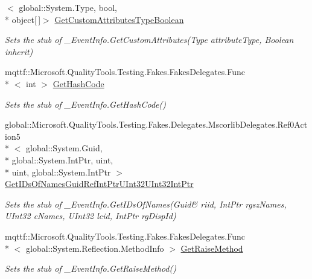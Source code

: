 \begin{DoxyCompactItemize}
$<$ global\-::\-System.\-Type, bool, \\*
object\mbox{[}$\,$\mbox{]}$>$ \hyperlink{class_system_1_1_runtime_1_1_interop_services_1_1_fakes_1_1_stub___event_info_a1caaf8be4ea096d739caa2dc458d4998}{Get\-Custom\-Attributes\-Type\-Boolean}
\begin{DoxyCompactList}\small\item\em Sets the stub of \-\_\-\-Event\-Info.\-Get\-Custom\-Attributes(\-Type attribute\-Type, Boolean inherit)\end{DoxyCompactList}\item 
mqttf\-::\-Microsoft.\-Quality\-Tools.\-Testing.\-Fakes.\-Fakes\-Delegates.\-Func\\*
$<$ int $>$ \hyperlink{class_system_1_1_runtime_1_1_interop_services_1_1_fakes_1_1_stub___event_info_acc1b5d3b8d23be39054feccccb30703f}{Get\-Hash\-Code}
\begin{DoxyCompactList}\small\item\em Sets the stub of \-\_\-\-Event\-Info.\-Get\-Hash\-Code()\end{DoxyCompactList}\item 
global\-::\-Microsoft.\-Quality\-Tools.\-Testing.\-Fakes.\-Delegates.\-Mscorlib\-Delegates.\-Ref0\-Action5\\*
$<$ global\-::\-System.\-Guid, \\*
global\-::\-System.\-Int\-Ptr, uint, \\*
uint, global\-::\-System.\-Int\-Ptr $>$ \hyperlink{class_system_1_1_runtime_1_1_interop_services_1_1_fakes_1_1_stub___event_info_aef7a21dc18b1fb5dca95ee51c19040f5}{Get\-I\-Ds\-Of\-Names\-Guid\-Ref\-Int\-Ptr\-U\-Int32\-U\-Int32\-Int\-Ptr}
\begin{DoxyCompactList}\small\item\em Sets the stub of \-\_\-\-Event\-Info.\-Get\-I\-Ds\-Of\-Names(Guid\& riid, Int\-Ptr rgsz\-Names, U\-Int32 c\-Names, U\-Int32 lcid, Int\-Ptr rg\-Disp\-Id)\end{DoxyCompactList}\item 
mqttf\-::\-Microsoft.\-Quality\-Tools.\-Testing.\-Fakes.\-Fakes\-Delegates.\-Func\\*
$<$ global\-::\-System.\-Reflection.\-Method\-Info $>$ \hyperlink{class_system_1_1_runtime_1_1_interop_services_1_1_fakes_1_1_stub___event_info_a8f8a64c86ebc07d40342ba9ed4182947}{Get\-Raise\-Method}
\begin{DoxyCompactList}\small\item\em Sets the stub of \-\_\-\-Event\-Info.\-Get\-Raise\-Method()\end{DoxyCompactList}\item 

\end{DoxyCompactItemize}
